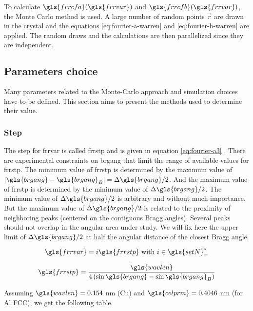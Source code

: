 To calculate \( \gls{frrcfa}(\gls{frrvar}) \) and \( \gls{frrcfb}(\gls{frrvar}) \), the Monte Carlo method is used.
A large number of random points \( \vec{r} \) are drawn in the crystal and the equations \eqref{eq:fourier-a-warren} and \eqref{eq:fourier-b-warren} are applied. The random draws and the calculations are then parallelized since they are independent.

\subsection{Parameters choice}

Many parameters related to the Monte-Carlo approach and simulation choices have to be defined.
This section aims to present the methods used to determine their value.

\subsubsection{Step}

The step for \gls{frrvar} is called \gls{frrstp} and is given in equation \eqref{eq:fourier-a3} \cite{W1990}.
There are experimental constraints on \gls{brgang} that limit the range of available values for \gls{frrstp}.
The minimum value of \gls{frrstp} is determined by the maximum value of \( | \gls{brgang} - \gls{brgang}_B | = \Delta \gls{brgang} / 2 \).
And the maximum value of \gls{frrstp} is determined by the minimum value of \( \Delta \gls{brgang} / 2 \).
The minimum value of \( \Delta \gls{brgang} / 2 \) is arbitrary and without much importance.
But the maximum value of \( \Delta \gls{brgang} / 2 \) is related to the proximity of neighboring peaks (centered on the contiguous Bragg angles).
Several peaks should not overlap in the angular area under study.
We will fix here the upper limit of \( \Delta \gls{brgang} / 2 \) at half the angular distance of the closest Bragg angle.

\begin{equation}\label{eq:fourier-L-step}
\gls{frrvar} = i \gls{frrstp} \ \text{with} \ i \in \gls{setN}^*_+
\end{equation}

\begin{equation}\label{eq:fourier-a3}
\gls{frrstp} = \frac{\gls{wavlen}}{4 \left( \sin \gls{brgang} - \sin \gls{brgang}_B \right)}
\end{equation}

\medskip

Assuming \( \gls{wavlen} = 0.154 \) nm (Cu) and \( \gls{celprm} =  0.4046 \) nm  (for Al FCC), we get the following table.


